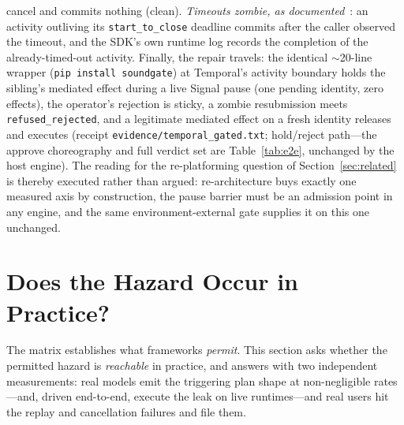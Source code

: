 \documentclass[10pt,journal,compsoc]{IEEEtran}
\begin{document}
cancel and commits nothing (clean). \emph{Timeouts zombie, as
documented}~\cite{temporal-docs}: an activity outliving its
\texttt{start\_to\_close} deadline commits after the caller observed the
timeout, and the SDK's own runtime log records the completion of the
already-timed-out activity. Finally, the repair travels: the identical
${\sim}$20-line wrapper (\texttt{pip install soundgate}) at Temporal's
activity boundary holds the sibling's mediated effect during a live Signal
pause (one pending identity, zero effects), the operator's rejection is
sticky, a zombie resubmission meets \texttt{refused\_rejected}, and a
legitimate mediated effect on a fresh identity releases and executes
(receipt \texttt{evidence/temporal\_gated.txt}; hold/reject path---the
approve choreography and full verdict set are Table~\ref{tab:e2e},
unchanged by the host engine). The reading for the re-platforming question
of Section~\ref{sec:related} is thereby executed rather than argued:
re-architecture buys exactly one measured axis by construction, the pause
barrier must be an admission point in any engine, and the same
environment-external gate supplies it on this one unchanged.

\section{Does the Hazard Occur in Practice?}
\label{sec:occurrence}
The matrix establishes what frameworks \emph{permit}. This section asks
whether the permitted hazard is \emph{reachable} in practice, and answers with
two independent measurements: real models emit the triggering plan shape at
non-negligible rates---and, driven end-to-end, execute the leak on live
runtimes---and real users hit the replay and cancellation failures and file
them.
\end{document}
